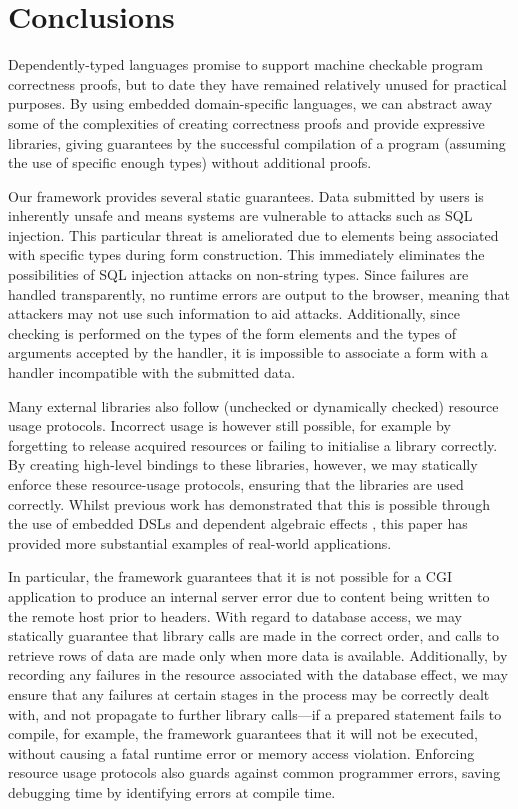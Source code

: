 
\section{Conclusions}

Dependently-typed languages promise to support machine checkable program
correctness proofs, but to date they have remained relatively unused for
practical purposes. By using embedded domain-specific languages, we can
abstract away some of the complexities of creating correctness proofs and
provide expressive libraries, giving guarantees by the successful compilation
of a program (assuming the use of specific enough types) without additional
proofs.

Our framework provides several static
guarantees. Data submitted by users is inherently unsafe and
means systems are vulnerable to attacks
such as SQL injection. This particular threat is ameliorated due
to elements being associated with specific types during form construction. This
immediately eliminates the possibilities of SQL injection attacks on non-string
types. Since failures are handled transparently, no runtime errors are output
to the browser, meaning that attackers may not use such information to aid
attacks. Additionally, since checking is performed on the types of the form
elements and the types of arguments accepted by the handler, it is impossible
to associate a form with a handler incompatible with the submitted data.

Many external libraries also follow (unchecked or dynamically checked) 
resource usage protocols.
Incorrect usage is however still possible, for
example by forgetting to release acquired resources or failing to
initialise a library correctly. By creating high-level bindings to these
libraries, however, we may statically enforce these resource-usage protocols,
ensuring that the libraries are used correctly. Whilst previous work has
demonstrated that this is possible through the use of embedded DSLs
\cite{brady:edsl} and dependent algebraic effects \cite{brady:effects},
this paper has provided more substantial examples of real-world applications. 

In particular, the framework guarantees that it is not possible for a CGI 
application to
produce an internal server error due to content being written to the remote
host prior to headers. With regard to database access, we may statically
guarantee that library calls are made in the correct order, and calls to
retrieve rows of data are made only when more data is available. Additionally,
by recording any failures in the resource associated with the database effect,
we may ensure that any failures at certain stages in the process may be
correctly dealt with, and not propagate to further library calls---if a
prepared statement fails to compile, for example, the framework guarantees that
it will not be executed, without causing a fatal runtime error or memory access
violation.
%
Enforcing resource usage protocols also guards against common programmer
errors, saving debugging time by identifying errors at compile time.

